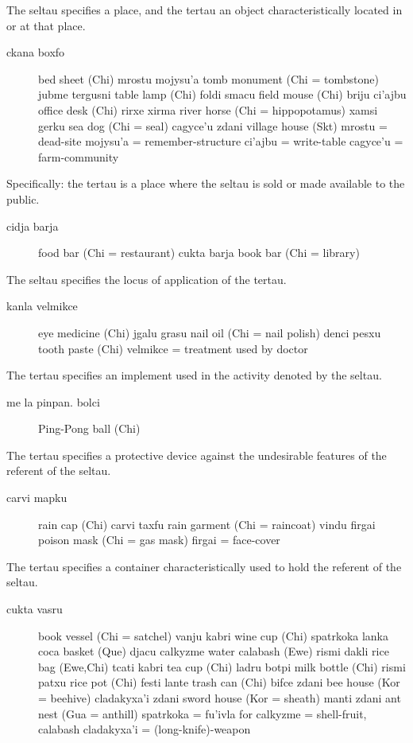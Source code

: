 The seltau specifies a place, and the tertau an object
    characteristically located in or at that place. 
\begin{description}
\item[ckana boxfo] bed sheet (Chi) mrostu mojysu'a tomb monument (Chi = tombstone) jubme tergusni table lamp (Chi) foldi smacu field mouse (Chi) briju ci'ajbu office desk (Chi) rirxe xirma river horse (Chi = hippopotamus) xamsi gerku sea dog (Chi = seal) cagyce'u zdani village house (Skt) mrostu = dead-site mojysu'a = remember-structure ci'ajbu = write-table cagyce'u = farm-community
\end{description}

Specifically: the tertau is a place where the seltau is sold or
    made available to the public. 
\begin{description}
\item[cidja barja] food bar (Chi = restaurant) cukta barja book bar (Chi = library)
\end{description}

The seltau specifies the locus of application of the tertau. 
\begin{description}
\item[kanla velmikce] eye medicine (Chi) jgalu grasu nail oil (Chi = nail polish) denci pesxu tooth paste (Chi) velmikce = treatment used by doctor
\end{description}

The tertau specifies an implement used in the activity denoted
    by the seltau. 
\begin{description}
\item[me la pinpan. bolci] Ping-Pong ball (Chi)
\end{description}

The tertau specifies a protective device against the
    undesirable features of the referent of the seltau. 
\begin{description}
\item[carvi mapku] rain cap (Chi) carvi taxfu rain garment (Chi = raincoat) vindu firgai poison mask (Chi = gas mask) firgai = face-cover
\end{description}

The tertau specifies a container characteristically used to
    hold the referent of the seltau. 
\begin{description}
\item[cukta vasru] book vessel (Chi = satchel) vanju kabri wine cup (Chi) spatrkoka lanka coca basket (Que) djacu calkyzme water calabash (Ewe) rismi dakli rice bag (Ewe,Chi) tcati kabri tea cup (Chi) ladru botpi milk bottle (Chi) rismi patxu rice pot (Chi) festi lante trash can (Chi) bifce zdani bee house (Kor = beehive) cladakyxa'i zdani sword house (Kor = sheath) manti zdani ant nest (Gua = anthill) spatrkoka = fu'ivla for  calkyzme = shell-fruit, calabash cladakyxa'i = (long-knife)-weapon
\end{description}

